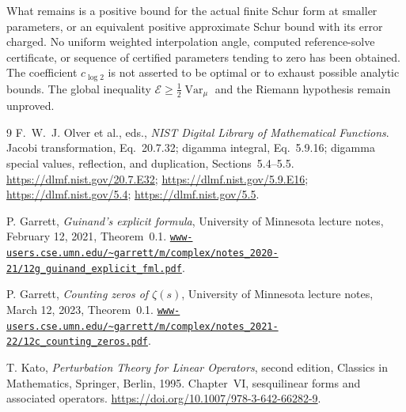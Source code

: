 \documentclass[11pt,a4paper]{article}
\numberwithin{equation}{section}
\theoremstyle{remark}
\newcommand{\E}{\mathcal E}
\newcommand{\Var}{\operatorname{Var}}
\begin{document}
What remains is a positive bound for the actual finite Schur form at smaller parameters, or an equivalent positive approximate Schur bound with its error charged. No uniform weighted interpolation angle, computed reference-solve certificate, or sequence of certified parameters tending to zero has been obtained. The coefficient $c_{\log2}$ is not asserted to be optimal or to exhaust possible analytic bounds. The global inequality $\E\ge\tfrac12\Var_\mu$ and the Riemann hypothesis remain unproved.

\clearpage
\begingroup
\small
\raggedright
{}
\begin{thebibliography}{9}
\setlength{\itemsep}{3pt}
F.~W.~J. Olver et al., eds.,
\emph{NIST Digital Library of Mathematical Functions}.
Jacobi transformation, Eq.~20.7.32; digamma integral, Eq.~5.9.16;
digamma special values, reflection, and duplication, Sections~5.4--5.5.
\url{https://dlmf.nist.gov/20.7.E32};
\url{https://dlmf.nist.gov/5.9.E16};
\url{https://dlmf.nist.gov/5.4};
\url{https://dlmf.nist.gov/5.5}.

P. Garrett, \emph{Guinand's explicit formula},
University of Minnesota lecture notes, February 12, 2021, Theorem~0.1.
\newline
\href{https://www-users.cse.umn.edu/~garrett/m/complex/notes_2020-21/12g_guinand_explicit_fml.pdf}{\nolinkurl{www-users.cse.umn.edu/~garrett/m/complex/notes_2020-21/12g_guinand_explicit_fml.pdf}}.

P. Garrett, \emph{Counting zeros of $\zeta(s)$},
University of Minnesota lecture notes, March 12, 2023, Theorem~0.1.
\newline
\href{https://www-users.cse.umn.edu/~garrett/m/complex/notes_2021-22/12c_counting_zeros.pdf}{\nolinkurl{www-users.cse.umn.edu/~garrett/m/complex/notes_2021-22/12c_counting_zeros.pdf}}.

T. Kato, \emph{Perturbation Theory for Linear Operators},
second edition, Classics in Mathematics, Springer, Berlin, 1995.
Chapter~VI, sesquilinear forms and associated operators.
\url{https://doi.org/10.1007/978-3-642-66282-9}.
\end{thebibliography}
\endgroup
\end{document}
